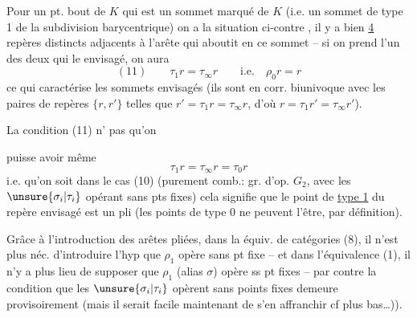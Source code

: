 Pour un pt. bout de $K$ qui est un sommet marqué de $K$ (i.e. un sommet de type 1 de la subdivision barycentrique) on a la situation ci-contre
, il y a bien \uline{4} repères distincts adjacents à l'arête qui aboutit en ce sommet -- si on prend l'un des deux qui     le  envisagé, on aura
\[
(11)\qquad\tau_1r=\tau_\infty r\qquad\text{i.e.}\quad\rho_0r=r
\]
ce qui caractérise les sommets envisagés (ils sont en corr. biunivoque avec les paires de repères $\{r,r'\}$ telles que $r'=\tau_1r=\tau_\infty r$, d'où $r=\tau_1r'=\tau_\infty r'$).

 La condition (11) n' pas qu'on



puisse avoir  même
\[
\tau_1r=\tau_\infty r=\tau_0r
\]
i.e. qu'on soit dans le cas (10) (purement comb.: gr. d'op. $G_2$, avec les $\unsure{\sigma_i|\tau_i}$ opérant sans pts fixes) cela signifie que le point de \uline{type 1} du repère envisagé est un pli (les points de type 0 ne peuvent l'être, par définition).

Grâce à l'introduction des arêtes pliées, dans la équiv. de catégories (8), il n'est plus néc. d'introduire l'hyp que $\rho_1$ opère sans pt fixe -- et dans l'équivalence (1), il n'y a plus lieu de supposer que $\rho_1$ (alias $\sigma$) opère ss pt fixes -- par contre la condition que les $\unsure{\sigma_i|\tau_i}$ opèrent sans points fixes demeure provisoirement (mais il serait facile maintenant de s'en affranchir  cf plus bas\ldots)).

